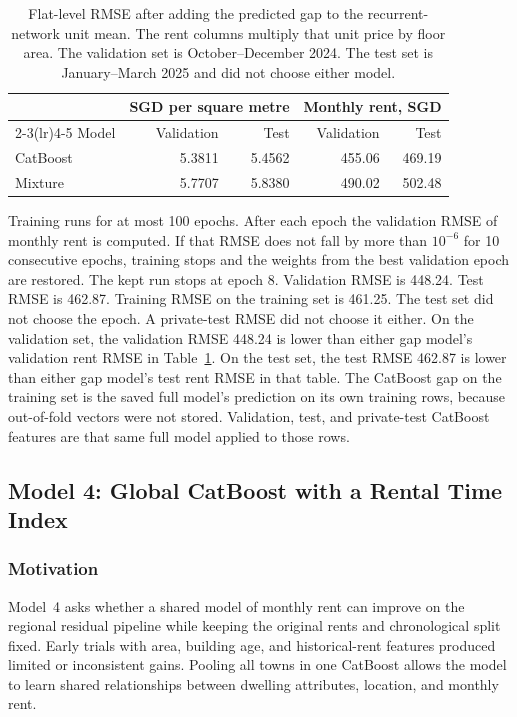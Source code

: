 \documentclass[11pt,a4paper]{article}
\begin{document}
\begin{table}[htbp]
\centering
\caption{Flat-level RMSE after adding the predicted gap to the recurrent-network unit mean.
The rent columns multiply that unit price by floor area.
The validation set is October--December 2024.
The test set is January--March 2025 and did not choose either model.}
\label{tab:gap}
\small
\setlength{\tabcolsep}{5pt}
\begin{tabular}{lrrrr}
\toprule
 & \multicolumn{2}{c}{SGD per square metre} & \multicolumn{2}{c}{Monthly rent, SGD} \\
\cmidrule(lr){2-3}\cmidrule(lr){4-5}
Model & Validation & Test & Validation & Test \\
\midrule
CatBoost & 5.3811 & 5.4562 & 455.06 & 469.19 \\
Mixture & 5.7707 & 5.8380 & 490.02 & 502.48 \\
\bottomrule
\end{tabular}
\end{table}

Training runs for at most 100 epochs.
After each epoch the validation RMSE of monthly rent is computed.
If that RMSE does not fall by more than \(10^{-6}\) for 10 consecutive epochs, training stops and the weights from the best validation epoch are restored.
The kept run stops at epoch 8.
Validation RMSE is 448.24.
Test RMSE is 462.87.
Training RMSE on the training set is 461.25.
The test set did not choose the epoch.
A private-test RMSE did not choose it either.
On the validation set, the validation RMSE 448.24 is lower than either gap model's validation rent RMSE in Table~\ref{tab:gap}.
On the test set, the test RMSE 462.87 is lower than either gap model's test rent RMSE in that table.
The CatBoost gap on the training set is the saved full model's prediction on its own training rows, because out-of-fold vectors were not stored.
Validation, test, and private-test CatBoost features are that same full model applied to those rows.

\FloatBarrier
\subsection{Model 4: Global CatBoost with a Rental Time Index}
\label{sec:time-index-model}

\subsubsection{Motivation}

Model~4 asks whether a shared model of monthly rent can improve on
the regional residual pipeline while keeping the original rents and
chronological split fixed.
Early trials with area, building age, and historical-rent features
produced limited or inconsistent gains.
Pooling all towns in one CatBoost allows the model to learn shared
relationships between dwelling attributes, location, and monthly rent.
\end{document}
